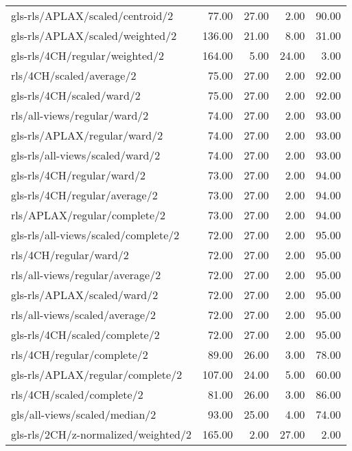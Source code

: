 \begin{longtable}{lrrrr}
    gls-rls/APLAX/scaled/centroid/2           &  77.00 & 27.00 &  2.00 & 90.00 \\
    gls-rls/APLAX/scaled/weighted/2           & 136.00 & 21.00 &  8.00 & 31.00 \\
    gls-rls/4CH/regular/weighted/2            & 164.00 &  5.00 & 24.00 &  3.00 \\
    rls/4CH/scaled/average/2                  &  75.00 & 27.00 &  2.00 & 92.00 \\
    gls-rls/4CH/scaled/ward/2                 &  75.00 & 27.00 &  2.00 & 92.00 \\
    rls/all-views/regular/ward/2              &  74.00 & 27.00 &  2.00 & 93.00 \\
    gls-rls/APLAX/regular/ward/2              &  74.00 & 27.00 &  2.00 & 93.00 \\
    gls-rls/all-views/scaled/ward/2           &  74.00 & 27.00 &  2.00 & 93.00 \\
    gls-rls/4CH/regular/ward/2                &  73.00 & 27.00 &  2.00 & 94.00 \\
    gls-rls/4CH/regular/average/2             &  73.00 & 27.00 &  2.00 & 94.00 \\
    rls/APLAX/regular/complete/2              &  73.00 & 27.00 &  2.00 & 94.00 \\
    gls-rls/all-views/scaled/complete/2       &  72.00 & 27.00 &  2.00 & 95.00 \\
    rls/4CH/regular/ward/2                    &  72.00 & 27.00 &  2.00 & 95.00 \\
    rls/all-views/regular/average/2           &  72.00 & 27.00 &  2.00 & 95.00 \\
    gls-rls/APLAX/scaled/ward/2               &  72.00 & 27.00 &  2.00 & 95.00 \\
    rls/all-views/scaled/average/2            &  72.00 & 27.00 &  2.00 & 95.00 \\
    gls-rls/4CH/scaled/complete/2             &  72.00 & 27.00 &  2.00 & 95.00 \\
    rls/4CH/regular/complete/2                &  89.00 & 26.00 &  3.00 & 78.00 \\
    gls-rls/APLAX/regular/complete/2          & 107.00 & 24.00 &  5.00 & 60.00 \\
    rls/4CH/scaled/complete/2                 &  81.00 & 26.00 &  3.00 & 86.00 \\
    gls/all-views/scaled/median/2             &  93.00 & 25.00 &  4.00 & 74.00 \\
    gls-rls/2CH/z-normalized/weighted/2       & 165.00 &  2.00 & 27.00 &  2.00 \\

\end{longtable}
